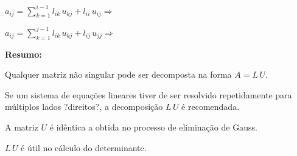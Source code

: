 \begin{center}
$
\displaystyle a_{ij} = \sum_{k = 1}^{i-1}l_{ik} \, u_{kj} + l_{ii} \, u_{ij} \Rightarrow
$
\end{center}

\begin{center}
$
\displaystyle a_{ij} = \sum_{k = 1}^{j-1}l_{ik} \, u_{kj} + l_{ij} \, u_{jj} \Rightarrow
$
\end{center}

\noindent
\textbf{Resumo:}

\begin{enumerar}

\item Qualquer matriz não singular pode ser decomposta na forma $A = L \, U$.

\item Se um sistema de equações lineares tiver de ser resolvido repetidamente para múltiplos lados ?direitos?, a decomposição $L \, U$ é recomendada.

\item A matriz $U$ é idêntica a obtida no processo de eliminação de Gauss.

\item $L \, U$ é útil no cálculo do determinante.

\end{enumerar}
